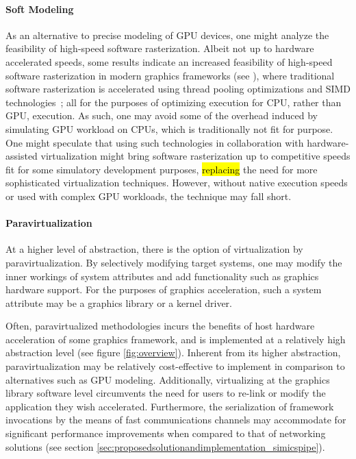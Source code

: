 \paragraph{Soft Modeling}
\label{par:backgroundandrelatedwork_graphicsvirtualization_softmodeling}
As an alternative to precise modeling of GPU devices, one might analyze the feasibility of high-speed software rasterization.
Albeit not up to hardware accelerated speeds, some results indicate an increased feasibility of high-speed software rasterization in modern graphics frameworks (see ), where traditional software rasterization is accelerated using thread pooling optimizations and SIMD technologies~; all for the purposes of optimizing execution for CPU, rather than GPU, execution.
As such, one may avoid some of the overhead induced by simulating GPU workload on CPUs, which is traditionally not fit for purpose.
One might speculate that using such technologies in collaboration with hardware-assisted virtualization might bring software rasterization up to competitive speeds fit for some simulatory development purposes, \hl{replacing} the need for more sophisticated virtualization techniques.
However, without native execution speeds or used with complex GPU workloads, the technique may fall short.

\paragraph{Paravirtualization}
\label{par:backgroundandrelatedwork_graphicsvirtualization_paravirtualization}
At a higher level of abstraction, there is the option of virtualization by paravirtualization.
By selectively modifying target systems, one may modify the inner workings of system attributes and add functionality such as graphics hardware support.
For the purposes of graphics acceleration, such a system attribute may be a graphics library or a kernel driver.

Often, paravirtualized methodologies incurs the benefits of host hardware acceleration of some graphics framework, and is implemented at a relatively high abstraction level (see figure \ref{fig:overview}).
Inherent from its higher abstraction, paravirtualization may be relatively cost-effective to implement in comparison to alternatives such as GPU modeling.
Additionally, virtualizing at the graphics library software level circumvents the need for users to re-link or modify the application they wish accelerated.
Furthermore, the serialization of framework invocations by the means of fast communications channels may accommodate for significant performance improvements when compared to that of networking solutions (see section \ref{sec:proposedsolutionandimplementation_simicspipe}).

